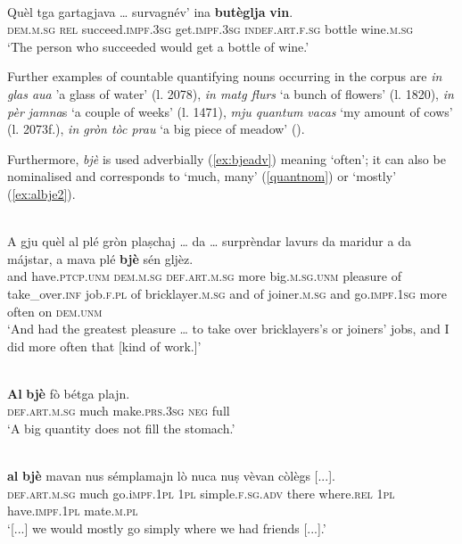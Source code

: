 \ea

\\
\gll    Quèl tga gartagjava … survagnév’ ina \textbf{butèglja} \textbf{vin}.\\
\textsc{dem.m.sg} \textsc{rel} succeed.\textsc{impf.3sg} {} get.\textsc{impf.3sg} \textsc{indef.art.f.sg} bottle wine.\textsc{m.sg}\\
\glt `The person who succeeded would get a bottle of wine.'
\z

Further examples of countable quantifying nouns occurring in the corpus are \textit{in glas aua} 'a glass of water' (l. 2078), \textit{in matg flurs} `a bunch of flowers' (l. 1820), \textit{in pèr jamna}s `a couple of weeks' (l. 1471), \textit{mju quantum vacas} `my amount of cows' (l. 2073f.), \textit{in gròn tòc prau} `a big piece of meadow' (\citet[121]{Büchli1966}).

Furthermore, \textit{bjè} is used adverbially (\ref{ex:bjeadv}) meaning `often'; it can also be nominalised and corresponds to `much, many' (\ref{quantnom}) or `mostly' (\ref{ex:albje2}).

\ea
\label{ex:bjeadv}
\\
\gll    A gju quèl al plé gròn plaṣchaj … da … surprèndar lavurs da maridur a da májstar, a mava plé \textbf{bjè} sén gljèz.\\
and have.\textsc{ptcp.unm} \textsc{dem.m.sg} \textsc{def.art.m.sg} more big.\textsc{m.sg.unm} pleasure {} of {} take\_over.\textsc{inf} job.\textsc{f.pl} of bricklayer.\textsc{m.sg} and of joiner.\textsc{m.sg} and  go.\textsc{impf.1sg} more often on \textsc{dem.unm}\\
\glt `And had the greatest pleasure … to take over bricklayers’s or joiners’ jobs, and I did more often that [kind of work.]'
\z

\ea\label{quantnom}
\\
\gll    \textbf{Al} \textbf{bjè} fò bétga plajn.\\
     \textsc{def.art.m.sg} much make.\textsc{prs.3sg} \textsc{neg} full\\
\glt `A big quantity does not fill the stomach.'
\z

\ea
\label{ex:albje2}
\\
	\gll [...] \textbf{al} \textbf{bjè} mavan nus sémplamajn lò nuca nuṣ vèvan còlègs [...].\\
{} \textsc{def.art.m.sg} much go.i\textsc{mpf.1pl} \textsc{1pl} simple.\textsc{f.sg.adv} there where.\textsc{rel} \textsc{1pl} have.\textsc{impf.1pl} mate.\textsc{m.pl}\\
\glt `[...] we would mostly go simply where we had friends [...].'
\z





